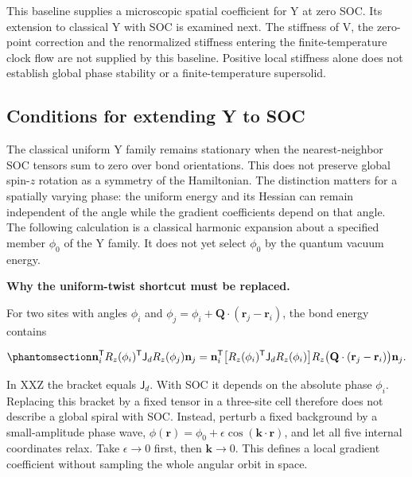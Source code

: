 This baseline supplies a microscopic spatial coefficient for Y at zero
SOC. Its extension to classical Y with SOC is examined next. The
stiffness of V, the zero-point correction and the renormalized stiffness
entering the finite-temperature clock flow are not supplied by this
baseline. Positive local stiffness alone does not establish global phase
stability or a finite-temperature supersolid.

\subsection{Conditions for extending Y to
SOC}\label{sec-nbcp-y-soc-conditions}

The classical uniform Y family remains stationary when the
nearest-neighbor SOC tensors sum to zero over bond orientations. This
does not preserve global spin-\(z\) rotation as a symmetry of the
Hamiltonian. The distinction matters for a spatially varying phase: the
uniform energy and its Hessian can remain independent of the angle while
the gradient coefficients depend on that angle. The following
calculation is a classical harmonic expansion about a specified member
\(\phi_0\) of the Y family. It does not yet select \(\phi_0\) by the
quantum vacuum energy.

\textbf{Why the uniform-twist shortcut must be replaced.}

For two sites with angles \(\phi_i\) and
\(\phi_j=\phi_i+\mathbf Q\cdot(\mathbf r_j-\mathbf r_i)\), the bond
energy contains

\begin{equation}\phantomsection\label{eq-nbcp-y-soc-twist-obstruction}{
\mathbf n_i^{\mathsf T}R_z(\phi_i)^{\mathsf T}\mathsf J_d R_z(\phi_j)\mathbf n_j
=\mathbf n_i^{\mathsf T}
\bigl[R_z(\phi_i)^{\mathsf T}\mathsf J_d R_z(\phi_i)\bigr]
R_z\bigl(\mathbf Q\cdot(\mathbf r_j-\mathbf r_i)\bigr)\mathbf n_j.
}\end{equation}

In XXZ the bracket equals \(\mathsf J_d\). With SOC it depends on the
absolute phase \(\phi_i\). Replacing this bracket by a fixed tensor in a
three-site cell therefore does not describe a global spiral with SOC.
Instead, perturb a fixed background by a small-amplitude phase wave,
\(\phi(\mathbf r)=\phi_0+\epsilon\cos(\mathbf k\cdot\mathbf r)\), and
let all five internal coordinates relax. Take \(\epsilon\to0\) first,
then \(\mathbf k\to0\). This defines a local gradient coefficient
without sampling the whole angular orbit in space.

